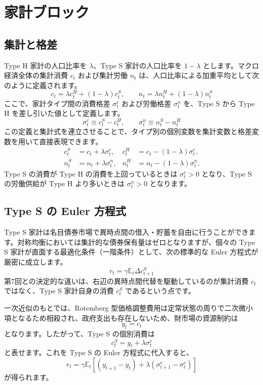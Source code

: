 \documentclass[
  japanese,
  lualatex,
  ja=standard,
  12pt,
  a4paper]{ltjsarticle}
\begin{document}
\section{家計ブロック}\label{ux5bb6ux8a08ux30d6ux30edux30c3ux30af}

\subsection{集計と格差}\label{ux96c6ux8a08ux3068ux683cux5dee}

Type H 家計の人口比率を \(\lambda\)、Type S 家計の人口比率を
\(1-\lambda\) とします。マクロ経済全体の集計消費 \(c_t\) および集計労働
\(n_t\) は、人口比率による加重平均として次のように定義されます。 \[
c_t = \lambda c_t^H + (1-\lambda) c_t^S,
\qquad
n_t = \lambda n_t^H + (1-\lambda) n_t^S
\] ここで、家計タイプ間の消費格差 \(\sigma_t^c\) および労働格差
\(\sigma_t^n\) を、Type S から Type H を差し引いた値として定義します。
\[
\sigma_t^c \equiv c_t^S - c_t^H,
\qquad
\sigma_t^n \equiv n_t^S - n_t^H
\]
この定義と集計式を連立させることで、タイプ別の個別変数を集計変数と格差変数を用いて直接表現できます。
\[
\begin{aligned}
c_t^S &= c_t + \lambda \sigma_t^c,
&
c_t^H &= c_t - (1-\lambda) \sigma_t^c,
\\
n_t^S &= n_t + \lambda \sigma_t^n,
&
n_t^H &= n_t - (1-\lambda) \sigma_t^n.
\end{aligned}
\] Type S の消費が Type H の消費を上回っているときは \(\sigma_t^c > 0\)
となり、Type S の労働供給が Type H より多いときは \(\sigma_t^n > 0\)
となります。

\subsection{Type S の Euler
方程式}\label{type-s-ux306e-euler-ux65b9ux7a0bux5f0f}

Type S
家計は名目債券市場で異時点間の借入・貯蓄を自由に行うことができます。対称均衡においては集計的な債券保有量はゼロとなりますが、個々の
Type S 家計が直面する最適化条件（一階条件）として、次の標準的な Euler
方程式が厳密に成立します。 \[
r_t = \gamma \mathbb{E}_t \Delta c_{t+1}^S
\] 第7回との決定的な違いは、右辺の異時点間代替を駆動しているのが集計消費
\(c_t\) ではなく、Type S 家計自身の消費 \(c_t^S\) であるという点です。

一次近似のもとでは、Rotemberg
型価格調整費用は定常状態の周りで二次微小項となるため相殺され、政府支出も存在しないため、財市場の資源制約は
\[
y_t = c_t
\] となります。したがって、Type S の個別消費は \[
c_t^S = y_t + \lambda \sigma_t^c
\] と表せます。これを Type S の Euler 方程式に代入すると、 \[
r_t
=
\gamma \mathbb{E}_t \left[ (y_{t+1} - y_t) + \lambda (\sigma_{t+1}^c - \sigma_t^c) \right]
\] が得られます。
\end{document}
